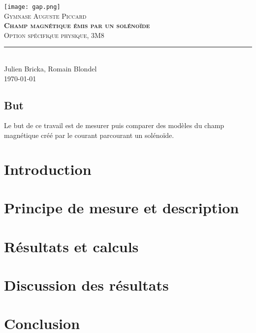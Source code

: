 \documentclass[11pt,titlepage]{article}
\begin{document}
\begin{titlepage}
	\centering
    \texttt{[image: gap.png]}\\[0.25cm] 	%
    \textsc{\LARGE Gymnase Auguste Piccard}\\ \vspace{\fill}
    \textbf{\textsc{\fontsize{40}{40}\selectfont Champ magnétique émis par un solénoïde}}\\ \vspace{\fill}		
	\textsc{\LARGE Option spécifique physique, 3M8}\\[0.4cm]
	\rule{\linewidth}{0.2 mm} \\[0.5 cm]
	Julien Bricka, Romain Blondel \\[2cm] \today
\end{titlepage}
\restoregeometry%

\thispagestyle{numberonly}
\begin{summary}
\section*{But}

Le but de ce travail est de mesurer puis comparer des modèles du champ magnétique créé par le courant parcourant un solénoïde.

\end{summary}

\section{Introduction}


\section{Principe de mesure et description}


\section{Résultats et calculs}


\section{Discussion des résultats}


\section{Conclusion}

\end{document}
